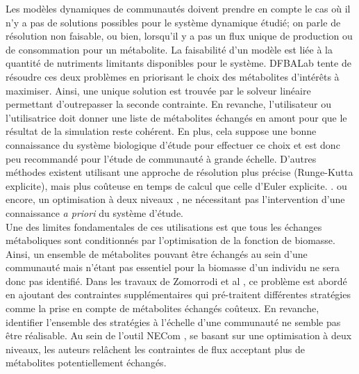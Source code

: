 \documentclass[../main.tex]{subfiles}
\begin{document}
Les modèles dynamiques de communautés doivent prendre en compte le cas où il n'y a pas de solutions possibles pour le système dynamique étudié; on parle de résolution non faisable, ou bien, lorsqu'il y a pas un flux unique de production ou de consommation pour un métabolite. La faisabilité d'un modèle est liée à la quantité de nutriments limitants disponibles pour le système. DFBALab \citep{Gomez2018} tente de résoudre ces deux problèmes en priorisant le choix des métabolites d'intérêts à maximiser. Ainsi, une unique solution est trouvée par le solveur linéaire permettant d'outrepasser la seconde contrainte. En revanche, l'utilisateur ou l'utilisatrice doit donner une liste de métabolites échangés en amont pour que le résultat de la simulation reste cohérent. En plus, cela suppose une bonne connaissance du système biologique d'étude pour effectuer ce choix et est donc peu recommandé pour l'étude de communauté à grande échelle. D'autres méthodes existent utilisant une approche de résolution plus précise (Runge-Kutta explicite), mais plus coûteuse en temps de calcul que celle d'Euler explicite. \citep{Schroeder2020}. ou encore, un optimisation à deux niveaux \citep{Zomorrodi}, ne nécessitant pas l'intervention d'une connaissance \textit{a priori} du système d'étude. \\



Une des limites fondamentales de ces utilisations est que tous les échanges métaboliques sont conditionnés par l'optimisation de la fonction de biomasse. Ainsi, un ensemble de métabolites pouvant être échangés au sein d'une communauté mais n'étant pas essentiel pour la biomasse d'un individu ne sera donc pas identifié. Dans les travaux de Zomorrodi et al \citep{Zomorrodi2017}, ce problème est abordé en ajoutant des contraintes supplémentaires qui pré-traitent différentes stratégies comme la prise en compte de métabolites échangés coûteux. En revanche, identifier l'ensemble des stratégies à l'échelle d'une communauté ne semble pas être réalisable. Au sein de l'outil NECom \citep{Cai2020}, se basant sur une optimisation à deux niveaux, les auteurs relâchent les contraintes de flux acceptant plus de métabolites potentiellement échangés. \\
\end{document}
